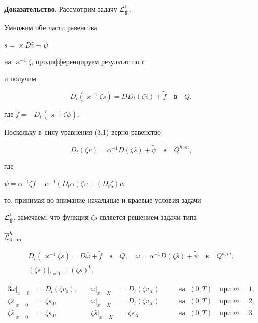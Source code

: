 {\bf Доказательство.} Рассмотрим задачу $\cal L_m^h$.


Умножим обе части равенства\quad


$s=\varkappa D\widehat v-\psi$


на $\varkappa^{-1}\zeta$, продифференцируем результат по $t$


и получим


$$


D_t(\varkappa^{-1}\zeta s)= D{D_t(\zeta \widehat v)}+\widetilde f


\quad\text{в}\quad Q,


$$


где $\widetilde f=-D_t(\varkappa^{-1}\zeta\psi)$.


Поскольку в силу уравнения (3.1) верно равенство


$$


D_t(\zeta v)=\alpha^{-1}D({\zeta\widehat s})+\widetilde\psi


\quad\text{в}\quad Q^{h;m},


$$


где


$\widetilde\psi=\alpha^{-1}\zeta f


-\alpha^{-1}(D_t\alpha) \zeta v+(D_t\zeta)v$,


то, принимая во внимание начальные и краевые условия задачи


$\cal L_m^h$, замечаем, что функция $\zeta s$ является решением задачи типа


$\overline{\cal L}_{4-m}^h$


\begin{gather}


D_t(\varkappa^{-1}\zeta s)=D\widehat\omega+\widetilde f\quad


\text{в}\quad Q,\quad


\omega =\alpha^{-1}D({\zeta\widehat s})+


\widetilde\psi\quad\text{в}\quad Q^{h;m},\\


(\zeta s)|_{t=0}=(\zeta s)^0,


\end{gather}


\vskip -10mm


\begin{alignat}{3}


\omega|_{x=0}&=D_t(\zeta v_0), &\quad


\omega|_{x=X}&=D_t(\zeta v_X) &\quad


&\text {на }\; (0,T)\quad \text{при $m=1$},\tag{$3.14_1$}\\


\zeta\widehat s|_{x=0}&=\zeta s_0, &\quad


\omega|_{x=X}&=D_t(\zeta v_X) &\quad


&\text {на }\; (0,T) \quad \text{при $m=2$},\tag{$3.14_2$}\\


\zeta\widehat s|_{x=0}&=\zeta s_0, &\quad


\zeta\widehat s|_{x=X}&=\zeta s_X &\quad


&\text {на }\; (0,T)\quad\text{при $m=3$}.\tag{$3.14_3$}


\end{alignat}



